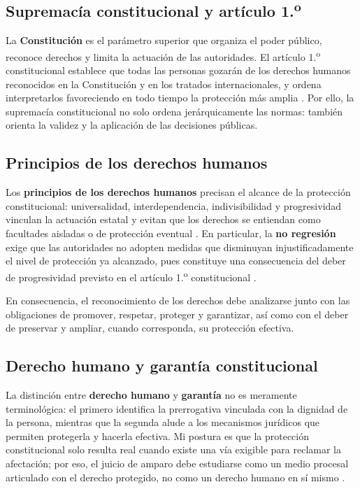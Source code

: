 \documentclass[
  spanish,
  letterpaper, oneside
]{article}
\begin{document}
\subsection{Supremacía constitucional y artículo 1.\textsuperscript{o}}
La \textbf{Constitución} es el parámetro superior que organiza el poder público, reconoce derechos y limita la actuación de las autoridades. El artículo 1.\textsuperscript{o} constitucional establece que todas las personas gozarán de los derechos humanos reconocidos en la Constitución y en los tratados internacionales, y ordena interpretarlos favoreciendo en todo tiempo la protección más amplia \citep{cpeum2026}. Por ello, la supremacía constitucional no solo ordena jerárquicamente las normas: también orienta la validez y la aplicación de las decisiones públicas.

\subsection{Principios de los derechos humanos}
Los \textbf{principios de los derechos humanos} precisan el alcance de la protección constitucional: universalidad, interdependencia, indivisibilidad y progresividad vinculan la actuación estatal y evitan que los derechos se entiendan como facultades aisladas o de protección eventual \citep{cpeum2026}. En particular, la \textbf{no regresión} exige que las autoridades no adopten medidas que disminuyan injustificadamente el nivel de protección ya alcanzado, pues constituye una consecuencia del deber de progresividad previsto en el artículo 1.\textsuperscript{o} constitucional \citep{cpeum2026}.

En consecuencia, el reconocimiento de los derechos debe analizarse junto con las obligaciones de promover, respetar, proteger y garantizar, así como con el deber de preservar y ampliar, cuando corresponda, su protección efectiva.

\subsection{Derecho humano y garantía constitucional}
La distinción entre \textbf{derecho humano} y \textbf{garantía} no es meramente terminológica: el primero identifica la prerrogativa vinculada con la dignidad de la persona, mientras que la segunda alude a los mecanismos jurídicos que permiten protegerla y hacerla efectiva. Mi postura es que la protección constitucional solo resulta real cuando existe una vía exigible para reclamar la afectación; por eso, el juicio de amparo debe estudiarse como un medio procesal articulado con el derecho protegido, no como un derecho humano en sí mismo \citep{cpeum2026,leyAmparo2026}.
\end{document}
